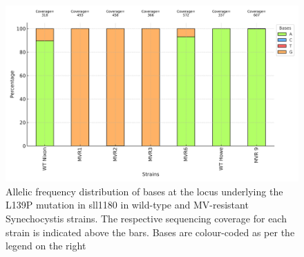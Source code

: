 \documentclass[12pt]{article}
\begin{document}
\begin{figure}[H]
    \centering
    \includegraphics[width=\hsize]{../Figures/MV_adaptation/SNPolimorphism.png}
    \caption{Allelic frequency distribution of bases at the locus underlying the L139P mutation in sll1180 in wild-type and MV-resistant Synechocystis strains. The respective sequencing coverage for each strain is indicated above the bars. Bases are colour-coded as per the legend on the right}
    \label{fig:SNPS}
\end{figure}
\end{document}
